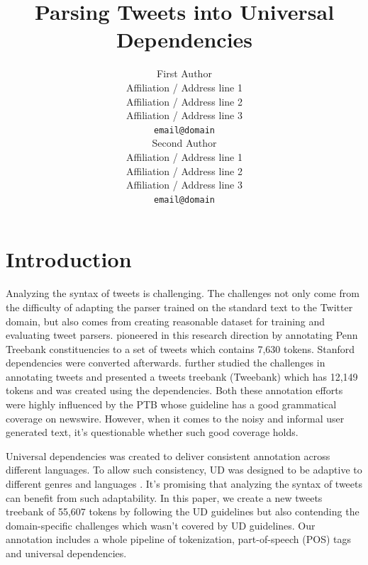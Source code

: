 \documentclass[11pt,a4paper]{article}
\title{Parsing Tweets into Universal Dependencies}
\author{First Author \\
  Affiliation / Address line 1 \\
  Affiliation / Address line 2 \\
  Affiliation / Address line 3 \\
  {\tt email@domain} \\\And
  Second Author \\
  Affiliation / Address line 1 \\
  Affiliation / Address line 2 \\
  Affiliation / Address line 3 \\
  {\tt email@domain} \\}
\date{}
\begin{document}
\maketitle
\begin{abstract}

\end{abstract}

\section{Introduction}
Analyzing the syntax of tweets is challenging. The challenges not
only come from the difficulty of adapting the parser trained on the
standard text to the Twitter domain, but also comes from creating
reasonable dataset for training and evaluating tweet parsers. 
\citet{AAAIW113912} pioneered in this research direction by
annotating Penn Treebank \citep[PTB]{Marcus93buildinga}
constituencies to a set of tweets which contains 7,630 tokens. 
Stanford dependencies were converted afterwards. 
\citet{kong-EtAl:2014:EMNLP2014} further studied the challenges in
annotating tweets and presented a tweets treebank ({\sc Tweebank})
which has 12,149 tokens and was created using the 
\citet{Yamada03statisticaldependency} dependencies. Both these
annotation efforts were highly influenced by the PTB whose guideline
has a good grammatical coverage on newswire. However, when it comes
to the noisy and informal user generated text, it's questionable
whether such good coverage holds.


Universal dependencies \citep[UD]{NIVRE16.348} was created to deliver
consistent annotation across different languages. To allow such
consistency, UD was designed to be adaptive to different genres and languages
\cite{guo-EtAl:2015:ACL-IJCNLP2,TACL892}. It's promising that analyzing
the syntax of tweets can benefit from such adaptability. In this paper,
we create a new tweets treebank of 55,607 tokens by following the UD
guidelines but also contending the domain-specific challenges which wasn't
covered by UD guidelines. Our annotation includes a whole pipeline of
tokenization, part-of-speech (POS) tags and universal dependencies.
\end{document}
